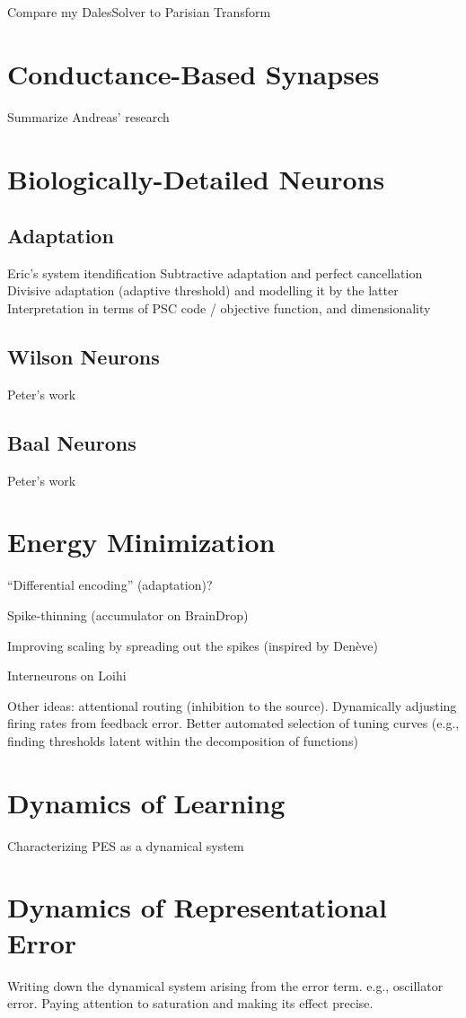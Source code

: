 Compare my DalesSolver to Parisian Transform

\section{Conductance-Based Synapses}

Summarize Andreas' research


\section{Biologically-Detailed Neurons}

\subsection{Adaptation}

Eric's system itendification
Subtractive adaptation and perfect cancellation
Divisive adaptation (adaptive threshold) and modelling it by the latter
Interpretation in terms of PSC code / objective function, and dimensionality

\subsection{Wilson Neurons}

Peter's work

\subsection{Baal Neurons}

Peter's work


\section{Energy Minimization}

``Differential encoding'' (adaptation)?

Spike-thinning (accumulator on BrainDrop)

Improving scaling by spreading out the spikes (inspired by Den\`eve)

Interneurons on Loihi

Other ideas: attentional routing (inhibition to the source). Dynamically adjusting firing rates from feedback error. Better automated selection of tuning curves (e.g., finding thresholds latent within the decomposition of functions)


\section{Dynamics of Learning}

Characterizing PES as a dynamical system


\section{Dynamics of Representational Error}

Writing down the dynamical system arising from the error term. e.g., oscillator error. Paying attention to saturation and making its effect precise.

